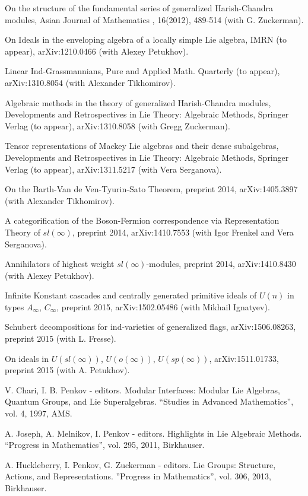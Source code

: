 \myss \label{57.} On the structure of the fundamental series of generalized Harish-Chandra modules, Asian Journal of Mathematics , 16(2012), 489-514 (with G. Zuckerman).

\myss \label{58.} On Ideals in the enveloping algebra of a locally simple Lie algebra, IMRN (to appear), arXiv:1210.0466 (with Alexey Petukhov).

\myss \label{59.} Linear Ind-Grassmannians, Pure and Applied Math. Quarterly (to appear), arXiv:1310.8054 (with Alexander Tikhomirov).

\myss \label{60.} Algebraic methods in the theory of generalized Harish-Chandra modules, Developments and Retrospectives in Lie Theory: Algebraic Methods, Springer Verlag (to appear), arXiv:1310.8058 (with Gregg Zuckerman).

\myss \label{61.} Tensor representations of Mackey Lie algebras and their dense subalgebras, Developments and Retrospectives in Lie Theory: Algebraic Methods, Springer Verlag (to appear), arXiv:1311.5217 (with Vera Serganova).

\myss \label{62.} On the Barth-Van de Ven-Tyurin-Sato Theorem, preprint 2014, arXiv:1405.3897 (with Alexander Tikhomirov).

\myss \label{63.} A categorification of the Boson-Fermion correspondence via Representation Theory of $sl(\infty)$, preprint 2014, arXiv:1410.7553 (with Igor Frenkel and Vera Serganova).

\myss \label{64.} Annihilators of highest weight $sl(\infty)$-modules, preprint 2014, arXiv:1410.8430 (with Alexey Petukhov).

\myss \label{65.} Infinite Konstant cascades and centrally generated primitive ideals of $U(n)$ in types $A_\infty$, $C_\infty$, preprint 2015, arXiv:1502.05486 (with Mikhail Ignatyev).

\myss \label{66.} Schubert decompositions for ind-varieties of generalized flags, arXiv:1506.08263, preprint 2015 (with L. Fresse).

\myss \label{67.} On ideals in $U(sl(\infty))$, $U(o(\infty))$, $U(sp(\infty))$, arXiv:1511.01733, preprint 2015 (with A. Petukhov).

\vspace*{1cm}


\medskip

\myss \label{1.} V. Chari, I. B. Penkov - editors. Modular Interfaces: Modular Lie Algebras,
Quantum Groups, and Lie Superalgebras. ``Studies in Advanced Mathematics'', vol. 4, 1997, AMS. 

\myss \label{2.} A. Joseph, A. Melnikov, I. Penkov - editors. Highlights in Lie Algebraic Methods. ``Progress
in Mathematics'', vol. 295, 2011,  Birkhauser.

\myss \label{3.} A. Huckleberry, I. Penkov, G. Zuckerman - editors. Lie Groups: Structure, Actions, and Representations. ''Progress in Mathematics'', vol. 306, 2013, Birkhauser.


